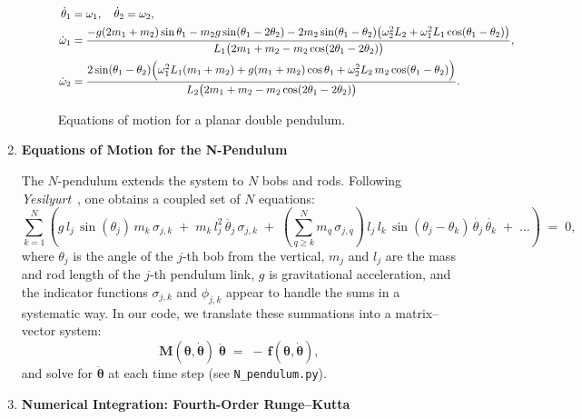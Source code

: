 \documentclass[letterpaper,12pt]{article}
\begin{document}
\begin{enumerate}[leftmargin=*, itemsep=1em]
\begin{figure*}[ht]
\centering
\[
\begin{aligned}
\dot{\theta}_1 &= \omega_1, \quad \dot{\theta}_2 = \omega_2, \\
\dot{\omega}_1 &= \frac{-g(2m_1 + m_2)\sin\theta_1 - m_2 g\sin(\theta_1 - 2\theta_2)
- 2m_2\sin(\theta_1 - \theta_2)\bigl(\omega_2^2 L_2 + \omega_1^2 L_1 \cos(\theta_1 - \theta_2)\bigr)}
{L_1 \bigl(2m_1 + m_2 - m_2 \cos(2\theta_1 - 2\theta_2)\bigr)}, \\
\dot{\omega}_2 &= \frac{2 \sin(\theta_1 - \theta_2)\Bigl(\omega_1^2 L_1 (m_1 + m_2)
+ g (m_1 + m_2)\cos\theta_1
+ \omega_2^2 L_2 \, m_2 \cos(\theta_1 - \theta_2)\Bigr)}
{L_2 \bigl(2m_1 + m_2 - m_2 \cos(2\theta_1 - 2\theta_2)\bigr)}.
\end{aligned}
\]
\caption{Equations of motion for a planar double pendulum.}
\label{fig:double-pendulum-eqns}
\end{figure*}

\item \textbf{Equations of Motion for the N-Pendulum}

The $N$-pendulum extends the system to $N$ bobs and rods. Following \textit{Yesilyurt}~\cite{yesilyurt2020equationsmotionformulationpendulum}, one obtains a coupled set of $N$ equations:
\[
\sum_{k=1}^{N}
\left(
g\,l_j\,\sin(\theta_j)\,m_k \,\sigma_{j,k}
\;+\;m_k \,l_j^2\,\ddot{\theta_j}\,\sigma_{j,k}
\;+\;\left(\!\!\sum_{q\ge k}^{N} m_q \,\sigma_{j,q}\right)\,l_j\,l_k\,
\sin(\theta_j-\theta_k)\,\dot{\theta_j}\,\dot{\theta_k}
\;+\;\ldots
\right)
\;=\;0,
\]
where $\theta_j$ is the angle of the $j$-th bob from the vertical, $m_j$ and $l_j$ are the mass and rod length of the $j$-th pendulum link, $g$ is gravitational acceleration, and the indicator functions $\sigma_{j,k}$ and $\phi_{j,k}$ appear to handle the sums in a systematic way. In our code, we translate these summations into a matrix--vector system:
\[
\mathbf{M}(\boldsymbol{\theta},\dot{\boldsymbol{\theta}})\;\ddot{\boldsymbol{\theta}}
\;=\;-\,\mathbf{f}(\boldsymbol{\theta},\dot{\boldsymbol{\theta}}),
\]
and solve for $\ddot{\boldsymbol{\theta}}$ at each time step (see \texttt{N\_pendulum.py}).

\item \textbf{Numerical Integration: Fourth-Order Runge–Kutta}


\end{enumerate}
\end{document}
